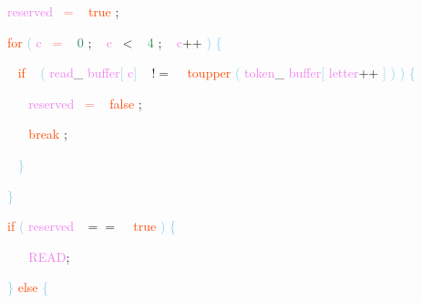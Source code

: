 \documentclass[8, usernames, dvipsnames]{beamer}
\begin{document}
\begin{frame}
\textcolor{White}{\   }
\textcolor{White}{\   }
\textcolor{White}{\   }
\textcolor{Violet}{reserved}\textcolor{White}{\ }
\textcolor{Salmon}{=}
\textcolor{White}{\ }
\textcolor{OrangeRed}{true}
\textcolor{Sepia}{;}

 \textcolor{White}{\   }
\textcolor{White}{\   }
\textcolor{White}{\   }
\textcolor{OrangeRed}{for}
\textcolor{SkyBlue}{(}
\textcolor{Violet}{c}\textcolor{White}{\ }
\textcolor{Salmon}{=}
\textcolor{White}{\ }
\textcolor{SeaGreen}{0}
\textcolor{Sepia}{;}
\textcolor{White}{\ }
\textcolor{Violet}{c}\textcolor{White}{\ }
\textcolor{OliveGreen}{\textless}
\textcolor{White}{\ }
\textcolor{SeaGreen}{4}
\textcolor{Sepia}{;}
\textcolor{White}{\ }
\textcolor{Violet}{c}\textcolor{Apricot}{++}
\textcolor{SkyBlue}{)}
\textcolor{SkyBlue}{\{ }

 \textcolor{White}{\   }
\textcolor{White}{\   }
\textcolor{White}{\   }
\textcolor{White}{\   }
\textcolor{OrangeRed}{if}
\textcolor{White}{\ }
\textcolor{SkyBlue}{(}
\textcolor{Violet}{read}\textcolor{Sepia}{\_}
\textcolor{Violet}{buffer}\textcolor{SkyBlue}{[}
\textcolor{Violet}{c}\textcolor{SkyBlue}{]}
\textcolor{White}{\ }
\textcolor{OliveGreen}{$!=$}
\textcolor{White}{\ }
\textcolor{OrangeRed}{toupper}
\textcolor{SkyBlue}{(}
\textcolor{Violet}{token}\textcolor{Sepia}{\_}
\textcolor{Violet}{buffer}\textcolor{SkyBlue}{[}
\textcolor{Violet}{letter}\textcolor{Apricot}{++}
\textcolor{SkyBlue}{]}
\textcolor{SkyBlue}{)}
\textcolor{SkyBlue}{)}
\textcolor{SkyBlue}{\{ }

 \textcolor{White}{\   }
\textcolor{White}{\   }
\textcolor{White}{\   }
\textcolor{White}{\   }
\textcolor{White}{\   }
\textcolor{Violet}{reserved}\textcolor{White}{\ }
\textcolor{Salmon}{=}
\textcolor{White}{\ }
\textcolor{OrangeRed}{false}
\textcolor{Sepia}{;}

 \textcolor{White}{\   }
\textcolor{White}{\   }
\textcolor{White}{\   }
\textcolor{White}{\   }
\textcolor{White}{\   }
\textcolor{OrangeRed}{break}
\textcolor{Sepia}{;}

 \textcolor{White}{\   }
\textcolor{White}{\   }
\textcolor{White}{\   }
\textcolor{White}{\   }
\textcolor{SkyBlue}{\} }

 \textcolor{White}{\   }
\textcolor{White}{\   }
\textcolor{White}{\   }
\textcolor{SkyBlue}{\} }

 \textcolor{White}{\   }
\textcolor{White}{\   }
\textcolor{White}{\   }
\textcolor{OrangeRed}{if}
\textcolor{SkyBlue}{(}
\textcolor{Violet}{reserved}\textcolor{White}{\ }
\textcolor{OliveGreen}{$==$}
\textcolor{White}{\ }
\textcolor{OrangeRed}{true}
\textcolor{SkyBlue}{)}
\textcolor{SkyBlue}{\{ }

 \textcolor{White}{\   }
\textcolor{White}{\   }
\textcolor{White}{\   }
\textcolor{White}{\   }
\textcolor{OrangeRed}{	}
\textcolor{White}{\ }
\textcolor{Violet}{READ}\textcolor{Sepia}{;}

 \textcolor{White}{\   }
\textcolor{White}{\   }
\textcolor{White}{\   }
\textcolor{SkyBlue}{\} }
\textcolor{OrangeRed}{else}
\textcolor{SkyBlue}{\{ }

 \end{frame}
\end{document}
